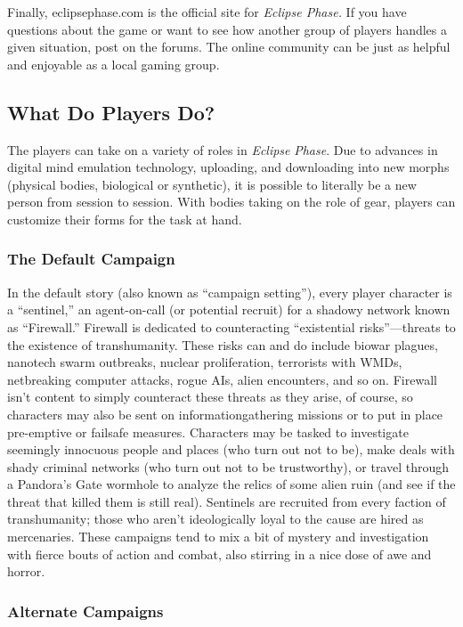Finally, eclipsephase.com is the official site for 
\textit{Eclipse Phase.} If you have questions about the 
game or want to see how another group of players 
handles a given situation, post on the forums. The 
online community can be just as helpful and enjoyable as a local gaming group.

\subsection{What Do Players Do?}

The players can take on a variety of roles in \textit{Eclipse }
\textit{Phase}. Due to advances in digital mind emulation 
technology, uploading, and downloading into new 
morphs (physical bodies, biological or synthetic), it is 
possible to literally be a new person from session to 
session. With bodies taking on the role of gear, players 
can customize their forms for the task at hand.

\subsubsection{The Default Campaign}

In the default story (also known as ``campaign setting''), every player character is a ``sentinel,'' an 
agent-on-call (or potential recruit) for a shadowy 
network known as ``Firewall.'' Firewall is dedicated 
to counteracting ``existential risks''—threats to the 
existence of transhumanity. These risks can and do 
include biowar plagues, nanotech swarm outbreaks, 
nuclear proliferation, terrorists with WMDs, netbreaking computer attacks, rogue AIs, alien encounters, and so on. Firewall isn't content to simply 
counteract these threats as they arise, of course, 
so characters may also be sent on informationgathering missions or to put in place pre-emptive 
or failsafe measures. Characters may be tasked to 
investigate seemingly innocuous people and places 
(who turn out not to be), make deals with shady 
criminal networks (who turn out not to be trustworthy), or travel through a Pandora's Gate wormhole 
to analyze the relics of some alien ruin (and see if 
the threat that killed them is still real). Sentinels 
are recruited from every faction of transhumanity; 
those who aren't ideologically loyal to the cause are 
hired as mercenaries. These campaigns tend to mix 
a bit of mystery and investigation with fierce bouts 
of action and combat, also stirring in a nice dose of 
awe and horror.

\subsubsection{Alternate Campaigns}

